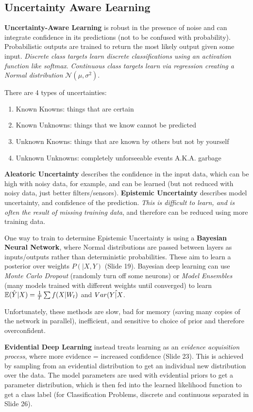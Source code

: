 \documentclass[onecolumn,a4paper]{article}
\begin{document}
\subsection{Uncertainty Aware Learning}

\textbf{Uncertainty-Aware Learning} is robust in the presence of noise and can integrate confidence in its predictions (not to be confused with probability). Probabilistic outputs are trained to return the most likely output given some input. \emph{Discrete class targets learn discrete classifications using an activation function like softmax}. \emph{Continuous class targets learn via regression creating a Normal distribution} $\mathcal{N}(\mu, \sigma^2)$.

There are 4 types of uncertainties:
\begin{enumerate}
    \item Known Knowns: things that are certain
    \item Known Unknowns: things that we know cannot be predicted
    \item Unknown Knowns: things that are known by others but not by yourself
    \item Unknown Unknowns: completely unforseeable events A.K.A. garbage
\end{enumerate}
\textbf{Aleatoric Uncertainty} describes the confidence in the input data, which can be high with noisy data, for example, and can be learned (but not reduced with noisy data, just better filters/sensors). \textbf{Epistemic Uncertainty} describes model uncertainty, and confidence of the prediction. \emph{This is difficult to learn, and is often the result of missing training data}, and therefore can be reduced using more training data.

One way to train to determine Epistemic Uncertainty is using a \textbf{Bayesian Neural Network}, where Normal distributions are passed between layers as inputs/outputs rather than deterministic probabilities. These aim to learn a posterior over weights $P(|X,Y)$ (Slide 19). Bayesian deep learning can use \emph{Monte Carlo Dropout} (randomly turn off some neurons) or \emph{Model Ensembles} (many models trained with different weights until converged) to learn $\mathbb{E}(\Hat{Y}|X)=\frac{1}{T}\sum f(X|W_t)$ and $Var(\Hat{Y|X}$.

Unfortunately, these methods are slow, bad for memory (saving many copies of the network in parallel), inefficient, and sensitive to choice of prior and therefore overconfident.

\textbf{Evidential Deep Learning} instead treats learning as an \emph{evidence acquisition process}, where more evidence = increased confidence (Slide 23). This is achieved by sampling from an evidential distribution to get an individual new distribution over the data. The model parameters are used with evidential priors to get a parameter distribution, which is then fed into the learned likelihood function to get a class label (for Classification Problems, discrete and continuous separated in Slide 26).

\end{document}

